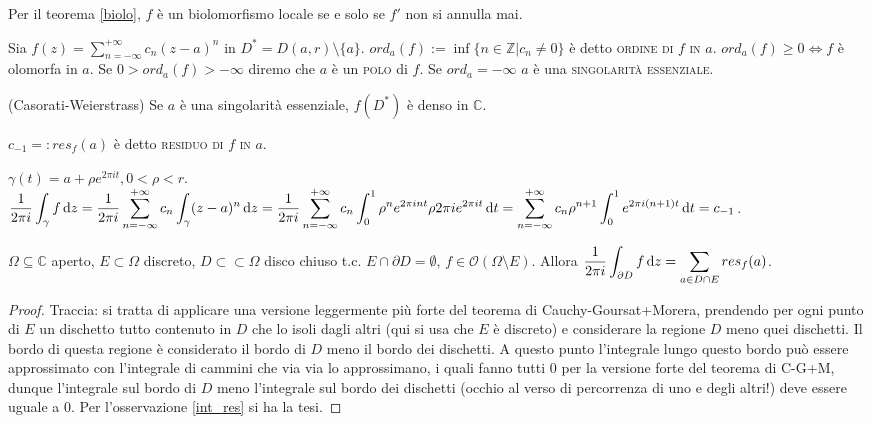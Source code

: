 Per il teorema \ref{biolo}, $f$ è un biolomorfismo locale se e solo se $f'$ non si annulla mai.

\begin{defn}
  Sia $\displaystyle f(z)=\sum_{n=-\infty}^{+\infty} c_n(z-a)^n$ in $D^*=D(a, r) \setminus \{a\}$. $ord_a(f):=\inf\{n \in \mathbb{Z} | c_n \not=0\}$ è detto \textsc{ordine di $f$ in $a$}. $ord_a(f) \ge 0 \Leftrightarrow f$ è olomorfa in $a$.
  Se $0>ord_a(f)>-\infty$ diremo che $a$ è un \textsc{polo} di $f$. Se $ord_a=-\infty$ $a$ è una \textsc{singolarità essenziale}.
\end{defn}

\begin{thm}
  (Casorati-Weierstrass) Se $a$ è una singolarità essenziale, $f(D^*)$ è denso in $\mathbb{C}$.
\end{thm}

\begin{defn}
  $c_{-1}=:res_f(a)$ è detto \textsc{residuo di $f$ in $a$}.
\end{defn}

\begin{oss} \label{int_res}
  $\gamma(t)=a+\rho e^{2\pi i t}, 0<\rho<r$. \\
  $\displaystyle \frac{1}{2\pi i} \int_{\gamma} f \mathop{}\!\mathrm{d} z=\frac{1}{2\pi i} \sum_{n=-\infty}^{+\infty} c_n \int_{\gamma} (z-a)^n \mathop{}\!\mathrm{d} z= \\ \frac{1}{2\pi i} \sum_{n=-\infty}^{+\infty} c_n \int_0^1 \rho^ne^{2\pi i n t} \rho 2 \pi i e^{2\pi i t} \mathop{}\!\mathrm{d} t=\sum_{n=-\infty}^{+\infty} c_n \rho^{n+1} \int_0^1 e^{2\pi i (n+1)t} \mathop{}\!\mathrm{d} t=c_{-1}$.
\end{oss}

\begin{prop}
  $\Omega \subseteq \mathbb{C}$ aperto, $E \subset \Omega$ discreto, $D \subset \subset \Omega$ disco chiuso t.c. $E \cap \partial D=\emptyset$, $f\in \mathcal{O}(\Omega \setminus E)$.
  Allora $\displaystyle \frac{1}{2\pi i}\int_{\partial D} f \mathop{}\!\mathrm{d} z=\sum_{a \in D \cap E} res_f(a)$.
\end{prop}

\begin{proof}
  Traccia: si tratta di applicare una versione leggermente più forte del teorema di Cauchy-Goursat+Morera, prendendo per ogni punto di $E$ un dischetto tutto contenuto in $D$ che lo isoli dagli altri (qui si usa che $E$ è discreto) e considerare la regione $D$ meno quei dischetti. Il bordo di questa regione è considerato il bordo di $D$ meno il bordo dei dischetti. A questo punto l'integrale lungo questo bordo può essere approssimato con l'integrale di cammini che via via lo approssimano, i quali fanno tutti $0$ per la versione forte del teorema di C-G+M, dunque l'integrale sul bordo di $D$ meno l'integrale sul bordo dei dischetti (occhio al verso di percorrenza di uno e degli altri!) deve essere uguale a $0$. Per l'osservazione \ref{int_res} si ha la tesi.
\end{proof}
